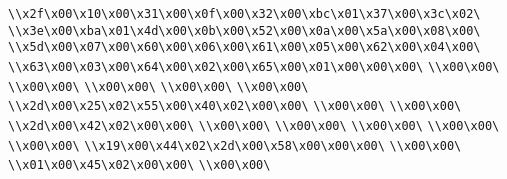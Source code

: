 \verb|\\x2f\x00\x10\x00\x31\x00\x0f\x00\x32\x00\xbc\x01\x37\x00\x3c\x02\|\newline
\verb|\\x3e\x00\xba\x01\x4d\x00\x0b\x00\x52\x00\x0a\x00\x5a\x00\x08\x00\|\newline
\verb|\\x5d\x00\x07\x00\x60\x00\x06\x00\x61\x00\x05\x00\x62\x00\x04\x00\|\newline
\verb|\\x63\x00\x03\x00\x64\x00\x02\x00\x65\x00\x01\x00\x00\x00\|\newline
\verb|\\x00\x00\|\newline
\verb|\\x00\x00\|\newline
\verb|\\x00\x00\|\newline
\verb|\\x00\x00\|\newline
\verb|\\x00\x00\|\newline
\verb|\\x2d\x00\x25\x02\x55\x00\x40\x02\x00\x00\|\newline
\verb|\\x00\x00\|\newline
\verb|\\x00\x00\|\newline
\verb|\\x2d\x00\x42\x02\x00\x00\|\newline
\verb|\\x00\x00\|\newline
\verb|\\x00\x00\|\newline
\verb|\\x00\x00\|\newline
\verb|\\x00\x00\|\newline
\verb|\\x00\x00\|\newline
\verb|\\x19\x00\x44\x02\x2d\x00\x58\x00\x00\x00\|\newline
\verb|\\x00\x00\|\newline
\verb|\\x01\x00\x45\x02\x00\x00\|\newline
\verb|\\x00\x00\|\newline
